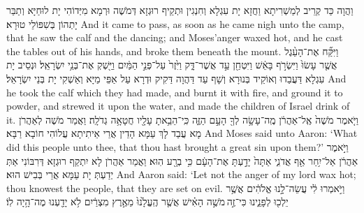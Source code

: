 {{}
{וַהֲוָה כַּד קְרֵיב לְמַשְׁרִיתָא וַחֲזָא יָת עִגְלָא וְחִנְגִין וּתְקֵיף רוּגְזָא דְּמֹשֶׁה וּרְמָא מִיְּדוֹהִי יָת לוּחַיָּא וְתַבַּר יָתְהוֹן בְּשִׁפּוֹלֵי טוּרָא׃}
{And it came to pass, as soon as he came nigh unto the camp, that he saw the calf and the dancing; and Moses’anger waxed hot, and he cast the tables out of his hands, and broke them beneath the mount.}{}
{וַיִּקַּ֞ח אֶת־הָעֵ֨גֶל אֲשֶׁ֤ר עָשׂוּ֙ וַיִּשְׂרֹ֣ף בָּאֵ֔שׁ וַיִּטְחַ֖ן עַ֣ד אֲשֶׁר־דָּ֑ק וַיִּ֙זֶר֙ עַל־פְּנֵ֣י הַמַּ֔יִם וַיַּ֖שְׁקְ אֶת־בְּנֵ֥י יִשְׂרָאֵֽל׃
}
{וּנְסֵיב יָת עִגְלָא דַּעֲבַדוּ וְאוֹקֵיד בְּנוּרָא וְשָׁף עַד דַּהֲוָה דַּקִיק וּדְרָא עַל אַפֵּי מַיָּא וְאַשְׁקִי יָת בְּנֵי יִשְׂרָאֵל׃}
{And he took the calf which they had made, and burnt it with fire, and ground it to powder, and strewed it upon the water, and made the children of Israel drink of it.}{}
{וַיֹּ֤אמֶר מֹשֶׁה֙ אֶֽל־אַהֲרֹ֔ן מֶֽה־עָשָׂ֥ה לְךָ֖ הָעָ֣ם הַזֶּ֑ה כִּֽי־הֵבֵ֥אתָ עָלָ֖יו חֲטָאָ֥ה גְדֹלָֽה׃
}
{וַאֲמַר מֹשֶׁה לְאַהֲרֹן מָא עֲבַד לָךְ עַמָּא הָדֵין אֲרֵי אֵיתִיתָא עֲלוֹהִי חוֹבָא רַבָּא׃}
{And Moses said unto Aaron: ‘What did this people unto thee, that thou hast brought a great sin upon them?’}{}
{וַיֹּ֣אמֶר אַהֲרֹ֔ן אַל־יִ֥חַר אַ֖ף אֲדֹנִ֑י אַתָּה֙ יָדַ֣עְתָּ אֶת־הָעָ֔ם כִּ֥י בְרָ֖ע הֽוּא׃
}
{וַאֲמַר אַהֲרֹן לָא יִתְקַף רוּגְזָא דְּרִבּוֹנִי אַתְּ יְדַעְתְּ יָת עַמָּא אֲרֵי בְּבִישׁ הוּא׃}
{And Aaron said: ‘Let not the anger of my lord wax hot; thou knowest the people, that they are set on evil.}{}
{וַיֹּ֣אמְרוּ לִ֔י עֲשֵׂה־לָ֣נוּ אֱלֹהִ֔ים אֲשֶׁ֥ר יֵלְכ֖וּ לְפָנֵ֑ינוּ כִּי־זֶ֣ה \legarmeh  מֹשֶׁ֣ה הָאִ֗ישׁ אֲשֶׁ֤ר הֶֽעֱלָ֙נוּ֙ מֵאֶ֣רֶץ מִצְרַ֔יִם לֹ֥א יָדַ֖עְנוּ מֶה־הָ֥יָה לֽוֹ׃}
}
